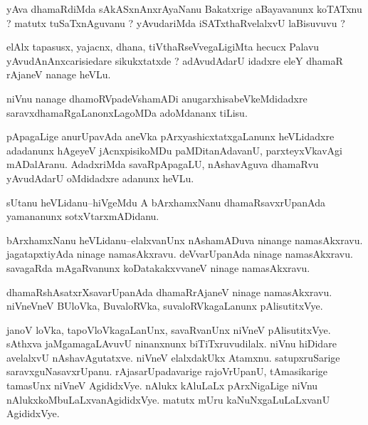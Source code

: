 \documentclass{article}
\begin{document}
\begin{mn}%
yAva dhamaRdiMda sAkASxnAnxrAyaNanu Bakatxrige aBayavanunx koTATxnu ? matutx 
tuSaTxnAguvanu ? yAvudariMda iSATxthaRvelalxvU laBisuvuvu ?
\end{mn}

\begin{mn}%
elAlx tapasusx, yajacnx, dhana, tiVthaRseVvegaLigiMta hecucx Palavu yAvudAnAnxcarisiedare 
sikukxtatxde ? adAvudAdarU idadxre eleY dhamaR rAjaneV nanage heVLu.
\end{mn}

\begin{mn}%
niVnu nanage dhamoRVpadeVshamADi anugarxhisabeVkeMdidadxre saravxdhamaRgaLanonxLagoMDa 
adoMdananx tiLisu.
\end{mn}

\begin{mn}%
pApagaLige anurUpavAda aneVka pArxyashicxtatxgaLanunx heVLidadxre adadanunx hAgeyeV 
jAcnxpisikoMDu paMDitanAdavanU, parxteyxVkavAgi mADalAranu. AdadxriMda savaRpApagaLU, 
nAshavAguva dhamaRvu yAvudAdarU oMdidadxre adanunx heVLu.
\end{mn}

\begin{mn}%
sUtanu heVLidanu--hiVgeMdu A bArxhamxNanu dhamaRsavxrUpanAda yamananunx sotxVtarxmADidanu.
\end{mn}

\begin{mn}%
bArxhamxNanu heVLidanu--elalxvanUnx nAshamADuva ninange namasAkxravu. jagatapxtiyAda 
ninage namasAkxravu. deVvarUpanAda ninage namasAkxravu. savagaRda mAgaRvanunx 
koDatakakxvvaneV ninage namasAkxravu.
\end{mn}

\begin{mn}%
dhamaRshAsatxrXsavarUpanAda dhamaRrAjaneV ninage namasAkxravu. niVneVneV BUloVka, 
BuvaloRVka, suvaloRVkagaLanunx pAlisutitxVye.
\end{mn}

\begin{mn}%
janoV loVka, tapoVloVkagaLanUnx, savaRvanUnx niVneV pAlisutitxVye. sAthxva jaMgamagaLAvuvU 
ninanxnunx biTiTxruvudilalx. niVnu hiDidare avelalxvU nAshavAgutatxve. niVneV elalxdakUkx 
Atamxnu. satupxruSarige saravxguNasavxrUpanu. rAjasarUpadavarige rajoVrUpanU, 
tAmasikarige tamasUnx niVneV AgididxVye. nAlukx kAluLaLx pArxNigaLige niVnu 
nAlukxkoMbuLaLxvanAgididxVye. matutx mUru kaNuNxgaLuLaLxvanU AgididxVye.
\end{mn}
\end{document}

